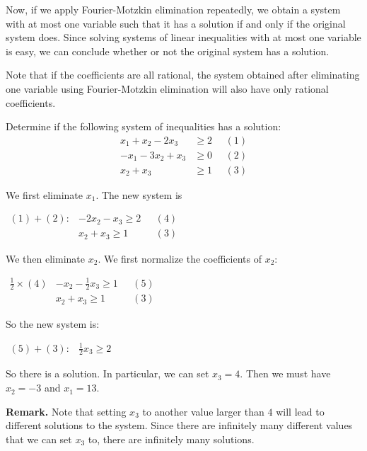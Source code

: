 Now, if we apply Fourier-Motzkin elimination repeatedly, we obtain a
system with at most one variable such that it has a solution if and only
if the original system does. Since solving systems of linear
inequalities with at most one variable is easy, we can conclude whether
or not the original system has a solution.

Note that if the coefficients are all rational, the system obtained
after eliminating one variable using Fourier-Motzkin elimination will
also have only rational coefficients.

\begin{example}{}{}
\protect\hypertarget{ex:unnamed-chunk-1}{}{\label{ex:unnamed-chunk-1}}Determine
if the following system of inequalities has a solution:
\begin{align*}
x_1 + x_2 - 2x_3 & \geq 2 ~~~~~~(1)\\
-x_1 - 3x_2 + x_3 & \geq 0~~~~~~(2) \\
x_2 + x_3 & \geq 1~~~~~~(3) 
\end{align*}

We first eliminate \(x_1\). The new system is

\(\begin{array}{rrl} (1) + (2): & -2x_2 - x_3 \geq 2 & ~~~(4) \\  & x_2 + x_3 \geq 1 & ~~~(3) \end{array}\)

We then eliminate \(x_2\). We first normalize the coefficients of
\(x_2\):

\(\begin{array}{rrl} \frac{1}{2}\times (4) & -x_2 - \frac{1}{2}x_3 \geq 1 & ~~~(5) \\  & x_2 + x_3 \geq 1 & ~~~(3) \end{array} \)

So the new system is:

\(\begin{array}{rl} (5)+(3): & \frac{1}{2} x_3 \geq 2 \end{array} \)

So there is a solution. In particular, we can set \(x_3 = 4\). Then we
must have \(x_2 = -3\) and \(x_1 = 13\).
\end{example}

\textbf{Remark.} Note that setting \(x_3\) to another value larger than
\(4\) will lead to different solutions to the system. Since there are
infinitely many different values that we can set \(x_3\) to, there are
infinitely many solutions.

